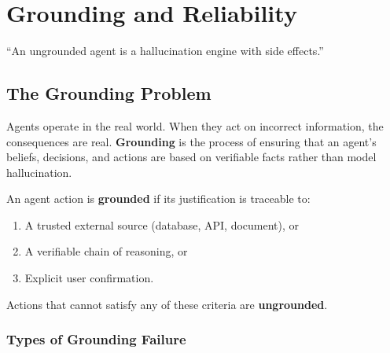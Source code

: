 \chapter{Grounding and Reliability}
\label{ch:grounding}

\epigraph{``An ungrounded agent is a hallucination engine with side effects.''}{}


\section{The Grounding Problem}

Agents operate in the real world. When they act on incorrect information, the consequences are real. \textbf{Grounding} is the process of ensuring that an agent's beliefs, decisions, and actions are based on verifiable facts rather than model hallucination.

\begin{definition}[Grounding]
	An agent action is \textbf{grounded} if its justification is traceable to:
	\begin{enumerate}
		\item A trusted external source (database, API, document), or
		\item A verifiable chain of reasoning, or
		\item Explicit user confirmation.
	\end{enumerate}
	Actions that cannot satisfy any of these criteria are \textbf{ungrounded}.
\end{definition}

\subsection{Types of Grounding Failure}


